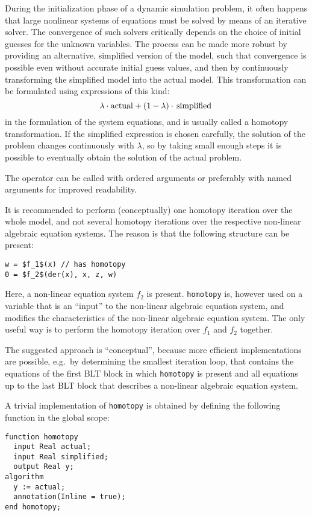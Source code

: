 \begin{nonnormative}
During the initialization phase of a dynamic simulation
problem, it often happens that large nonlinear systems of equations must
be solved by means of an iterative solver. The convergence of such
solvers critically depends on the choice of initial guesses for the
unknown variables. The process can be made more robust by providing an
alternative, simplified version of the model, such that convergence is
possible even without accurate initial guess values, and then by
continuously transforming the simplified model into the actual model.
This transformation can be formulated using expressions of this kind:
\begin{equation*}
\lambda\cdot\text{\lstinline!actual!} + (1-\lambda)\cdot\text{\lstinline!simplified!}
\end{equation*}
in the formulation of the system equations, and is usually called
a homotopy transformation. If the simplified expression is chosen
carefully, the solution of the problem changes continuously with $\lambda$,
so by taking small enough steps it is possible to eventually obtain the
solution of the actual problem.

The operator can be called with ordered arguments or preferably
with named arguments for improved readability.

It is recommended to perform (conceptually) one homotopy iteration
over the whole model, and not several homotopy iterations over the
respective non-linear algebraic equation systems. The reason is that the
following structure can be present:
\begin{lstlisting}[language=modelica]
w = $f_1$(x) // has homotopy
0 = $f_2$(der(x), x, z, w)
\end{lstlisting}

Here, a non-linear equation system $f_2$
is present. \lstinline!homotopy! is, however used on a variable
that is an ``input'' to the non-linear algebraic equation system, and
modifies the characteristics of the non-linear algebraic equation
system. The only useful way is to perform the homotopy iteration over
$f_1$ and $f_2$ together.

The suggested approach is ``conceptual'', because more efficient
implementations are possible, e.g.\ by determining the smallest iteration
loop, that contains the equations of the first BLT block in which
\lstinline!homotopy! is present and all equations up to the last BLT block
that describes a non-linear algebraic equation system.

A trivial implementation of \lstinline!homotopy! is obtained by
defining the following function in the global scope:
\begin{lstlisting}[language=modelica]
function homotopy
  input Real actual;
  input Real simplified;
  output Real y;
algorithm
  y := actual;
  annotation(Inline = true);
end homotopy;
\end{lstlisting}
\end{nonnormative}

